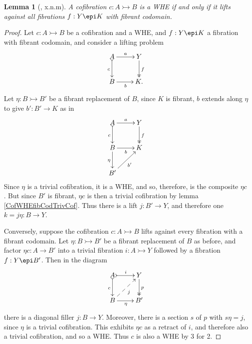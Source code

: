 \documentclass[11pt]{article}
\newcommand{\mono}{\ensuremath{\rightarrowtail}}
\newcommand{\ra}{\ensuremath{\rightarrow}}
\newtheorem{proposition}[theorem]{Proposition}
\newtheorem{lemma}[theorem]{Lemma}
\theoremstyle{remark}
\theoremstyle{definition}
\begin{document}
\begin{lemma}[\cite{Cisinski:??}, x.n.m]\label{lemma:CofWHEiffFibLift}
A cofibration $ c : A \mono B$ is a WHE if and only if it lifts against all fibrations $f : Y\epi K$ with fibrant codomain.
\end{lemma}
%
\begin{proof}
Let $c : A\mono B$ be a cofibration and a WHE, and  $f : Y\epi K$ a fibration with fibrant codomain, and consider a lifting problem
\begin{equation*}%
\xymatrix{
A \ar@{>->}[d]_{c} \ar[r]^-{a}  & Y \ar@{>>}[d]^{f} \\
B \ar[r]_{b} &  K.
}
\end{equation*}
Let $\eta : B\mono B'$ be a fibrant replacement of $B$, since $K$ is fibrant, $b$ extends along $\eta$ to give $b' : B'\ra K$ as in   
\begin{equation*}%
\xymatrix{
A \ar@{>->}[d]_{c} \ar[r]^-{a}  & Y \ar@{>>}[d]^{f} \\
B \ar[r]_{b} \ar[d]_\eta &  K\\
B' \ar[ru]_{b'} & 
}
\end{equation*}
Since $\eta$ is a trivial cofibration, it is a WHE, and so, therefore, is the composite $\eta c$.  But since $B'$ is fibrant, $\eta c$ is then a trivial cofibration by lemma \ref{CofWHEfibCodTrivCof}.  Thus there is a lift $j : B'\ra Y$, and therefore one $k = j\eta : B\ra Y$. 

Conversely, suppose the cofibration $c : A\mono B$ lifts against every fibration with a fibrant codomain.   Let $\eta : B\mono B'$ be a fibrant replacement of $B$ as before, and factor $\eta c: A \to B'$ into a trivial fibration $i : A\mono Y$ followed by a fibration $f : Y\epi B'$. Then in the diagram
\begin{equation*}%
\xymatrix{
A \ar@{>->}[d]_{c} \ar@{>->} [r]^-{i}  & Y \ar@{>>}[d]^{p} \\
B \ar[r]_{\eta} \ar@{-->}[ru]_{j} &  B'
}
\end{equation*}
there is a diagonal filler $j : B\ra Y$.  Moreover, there is a section $s$ of $p$ with $s\eta = j$, since $\eta$ is a trivial cofibration. This exhibits $\eta c$ as a retract of $i$, and therefore also a trivial cofibration, and so a WHE.  Thus $c$ is also a WHE by 3 for 2.
\end{proof}

\end{document}
